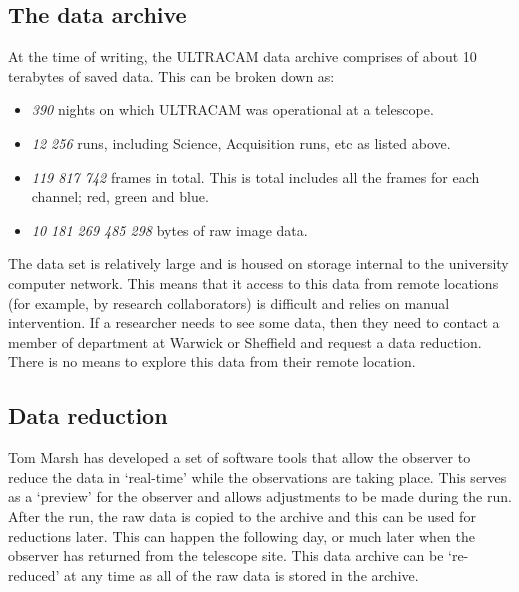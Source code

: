 \documentclass[a4paper,10pt]{article}
\begin{document}
\subsection{The data archive}
At the time of writing, the ULTRACAM data archive comprises of about 10 terabytes of saved data. This can be broken down as:
\begin{itemize}
	\item \emph{390} nights on which ULTRACAM was operational at a telescope.
	\item \emph{12 256} runs, including Science, Acquisition runs, etc as listed above. 
	\item \emph{119 817 742} frames in total. This is total includes all the frames for each channel; red, green and blue.
	\item \emph{10 181 269 485 298} bytes of raw image data.
\end{itemize} 
The data set is relatively large and is housed on storage internal to the university computer network. This means that it access to this data from remote locations (for example, by research collaborators) is difficult and relies on manual intervention. If a researcher needs to see some data, then they need to contact a member of department at Warwick or Sheffield and request a data reduction. There is no means to explore this data from their remote location. 

\subsection{Data reduction}
Tom Marsh has developed a set of software tools that allow the observer to reduce the data in `real-time' while the observations are taking place. This serves as a `preview' for the observer and allows adjustments to be made during the run. After the run, the raw data is copied to the archive and this can be used for reductions later. This can happen the following day, or much later when the observer has returned from the telescope site. This data archive can be `re-reduced' at any time as all of the raw data is stored in the archive. 
\end{document}
